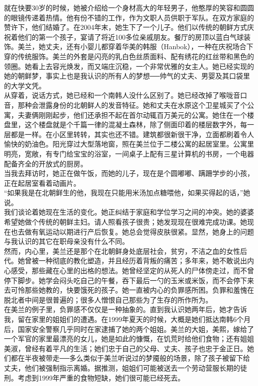 就在快要30岁的时候，她被介绍给一个身材高大的年轻男子，他憨厚的笑容和圆圆的眼镜传递着热情。他有份不错的工作，作为文职人员供职于军队。在双方家庭的赞许下，他们结婚了。在2004年末，她生下了一个儿子。他们以传统的朝鲜方式庆祝着他们的第一个孩子，宴请了将近100多位亲戚朋友。餐厅的房顶以蓝白气球装饰。美兰，她丈夫，还有小婴儿都穿着华美的韩服（Hanbok），一种在庆祝场合下穿的传统服饰。美兰的外套是闪亮的乳白色丝质面料、配有绣花的红丝带和黑色的领圈。她看上去容光焕发，而又端庄沉稳，一个非常优雅的女主人。她已经实现的她的朝鲜梦，事实上也是我认识的所有人的梦想──帅气的丈夫、男婴及其口袋里的大学文凭。\\

从穿着，说话方式，她已经和一个南韩人没什么区别了。她已经改掉了喉咙音口音，那种会泄露身份的北朝鲜人的发音特征。她和丈夫在水原这个卫星城买了个公寓，夫妻俩刚刚起步，他们还承担不起在首尔动辄百万美元的公寓。她住在一个楼盘里，这个楼盘就是个千篇一律的混凝土森林，除了侧面印着的楼层数字外，每一层都是一样。在小区里转转，其实也还不错。建筑都很新很干净，立面都刷着令人愉快的奶油色。阳光穿过大型落地窗，照在美兰位于二楼公寓的起居室里。公寓里明亮，宽敞，有专门给宝宝的浴室，一间桌子上配有三星计算机的书房，一个电器配备齐全的开放式的厨房。\\

当我去拜访时，她正在做午饭，而她的儿子，现在是个圆嘟嘟、蹒跚学步的小孩，正在起居室看着动画片。\\

“如果我是在北朝鲜生的他，我现在只能用米汤加点糖喂他，如果买得起的话，”她说。\\

我们谈论着她现在生活的变化。她正纠结于家庭和学位学习之间的冲突。她的婆婆希望她做个传统的朝鲜主妇。请人照看孩子很贵；她发现现在很难完成功课。她现在也去做有氧运动以期进行产后恢复。她总会觉得皮肤很紧。显然，她身上的问题与我认识的其它在职母亲没有什么不同。\\

然而，内心里，美兰还是那个在北朝鲜身处底层社会，贫穷，不洁之血的女性后代。她曾被一种彻底的教化塑造，并且经历着背叛的痛苦；多年来，她不敢说出内心感受，那些藏在心里的出格的想法。她曾经坚定的从死人的尸体傍走过，而不曾停下脚步。她学会闷头吃自己的午餐，吞下最后一勺的玉米或米饭，而不会停下来去可怜那些她教的，快要饿死的孩子。她一直被内心的负罪感所困。负罪和羞愧在脱北者中间是很普遍的；很多人憎恨自己那些为了生存的所作所为。\\

在美兰的例子里，负罪感不仅仅是一种抽象的。直到我认识她两年后，她才告诉我，留在家里的姐姐们的遭遇。在1999年夏天的时候，大概是她们抵达南韩6个月后，国家安全警察几乎同时在家逮捕了她的两个姐姐。美兰的大姐，美熙，嫁给了一个军官的家里最漂亮的女儿，她是如此的慷慨，在饥荒时给他们食物；还有姐姐美淑，曾经有着平凡的生活；她们忠于自己的父母、丈夫、孩子也忠于金正日。她们都在半夜被带走──多么类似于美兰听说过的梦魇般的场景，除了孩子被留下给丈夫，他们被强制指示离婚。据推测，姐姐们可能被送去一个劳动营服长期的徒刑。考虑到1999年严重的食物短缺，她们很可能已经死去。\\

